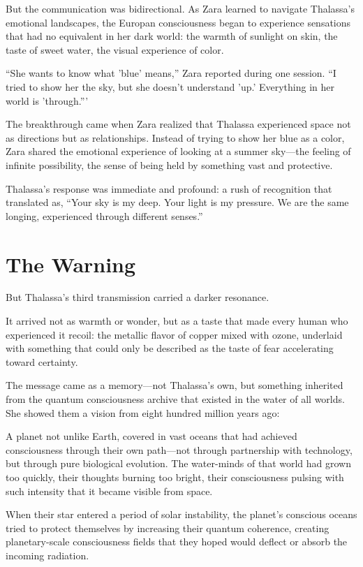 But the communication was bidirectional. As Zara learned to navigate Thalassa's emotional landscapes, the Europan consciousness began to experience sensations that had no equivalent in her dark world: the warmth of sunlight on skin, the taste of sweet water, the visual experience of color.

``She wants to know what 'blue' means,'' Zara reported during one session. ``I tried to show her the sky, but she doesn't understand 'up.' Everything in her world is 'through.'''

The breakthrough came when Zara realized that Thalassa experienced space not as directions but as relationships. Instead of trying to show her blue as a color, Zara shared the emotional experience of looking at a summer sky—the feeling of infinite possibility, the sense of being held by something vast and protective.

Thalassa's response was immediate and profound: a rush of recognition that translated as, ``Your sky is my deep. Your light is my pressure. We are the same longing, experienced through different senses.''

\section{The Warning}

But Thalassa's third transmission carried a darker resonance.

It arrived not as warmth or wonder, but as a taste that made every human who experienced it recoil: the metallic flavor of copper mixed with ozone, underlaid with something that could only be described as the taste of fear accelerating toward certainty.

The message came as a memory—not Thalassa's own, but something inherited from the quantum consciousness archive that existed in the water of all worlds. She showed them a vision from eight hundred million years ago:

A planet not unlike Earth, covered in vast oceans that had achieved consciousness through their own path—not through partnership with technology, but through pure biological evolution. The water-minds of that world had grown too quickly, their thoughts burning too bright, their consciousness pulsing with such intensity that it became visible from space.

When their star entered a period of solar instability, the planet's conscious oceans tried to protect themselves by increasing their quantum coherence, creating planetary-scale consciousness fields that they hoped would deflect or absorb the incoming radiation.

